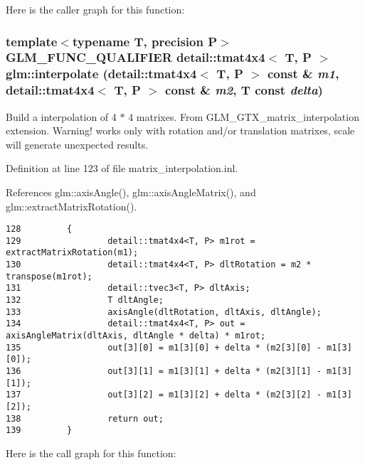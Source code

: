 Here is the caller graph for this function:\hypertarget{group__gtx__matrix__interpolation_gc618bbef632f87be5c570aa5afe63f30}{
\subsubsection[interpolate]{\setlength{\rightskip}{0pt plus 5cm}template$<$typename T, precision P$>$ GLM\_\-FUNC\_\-QUALIFIER detail::tmat4x4$<$ T, P $>$ glm::interpolate (detail::tmat4x4$<$ T, P $>$ const \& {\em m1}, \/  detail::tmat4x4$<$ T, P $>$ const \& {\em m2}, \/  T const  {\em delta})}}
\label{group__gtx__matrix__interpolation_gc618bbef632f87be5c570aa5afe63f30}


Build a interpolation of 4 $\ast$ 4 matrixes. From GLM\_\-GTX\_\-matrix\_\-interpolation extension. Warning! works only with rotation and/or translation matrixes, scale will generate unexpected results. 

Definition at line 123 of file matrix\_\-interpolation.inl.

References glm::axisAngle(), glm::axisAngleMatrix(), and glm::extractMatrixRotation().

\begin{Code}\begin{verbatim}128         {
129                 detail::tmat4x4<T, P> m1rot = extractMatrixRotation(m1);
130                 detail::tmat4x4<T, P> dltRotation = m2 * transpose(m1rot);
131                 detail::tvec3<T, P> dltAxis;
132                 T dltAngle;
133                 axisAngle(dltRotation, dltAxis, dltAngle);
134                 detail::tmat4x4<T, P> out = axisAngleMatrix(dltAxis, dltAngle * delta) * m1rot;
135                 out[3][0] = m1[3][0] + delta * (m2[3][0] - m1[3][0]);
136                 out[3][1] = m1[3][1] + delta * (m2[3][1] - m1[3][1]);
137                 out[3][2] = m1[3][2] + delta * (m2[3][2] - m1[3][2]);
138                 return out;
139         }
\end{verbatim}
\end{Code}




Here is the call graph for this function: